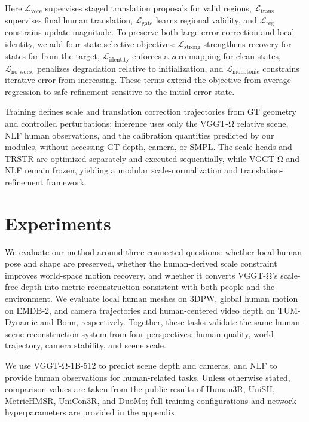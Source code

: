 \documentclass{article}
\begin{document}
Here $\mathcal{L}_{\mathrm{vote}}$ supervises staged translation proposals for valid regions, $\mathcal{L}_{\mathrm{trans}}$ supervises final human translation, $\mathcal{L}_{\mathrm{gate}}$ learns regional validity, and $\mathcal{L}_{\mathrm{reg}}$ constrains update magnitude. To preserve both large-error correction and local identity, we add four state-selective objectives: $\mathcal{L}_{\mathrm{strong}}$ strengthens recovery for states far from the target, $\mathcal{L}_{\mathrm{identity}}$ enforces a zero mapping for clean states, $\mathcal{L}_{\mathrm{no\text{-}worse}}$ penalizes degradation relative to initialization, and $\mathcal{L}_{\mathrm{monotonic}}$ constrains iterative error from increasing. These terms extend the objective from average regression to safe refinement sensitive to the initial error state.

Training defines scale and translation correction trajectories from GT geometry and controlled perturbations; inference uses only the VGGT-Ω relative scene, NLF human observations, and the calibration quantities predicted by our modules, without accessing GT depth, camera, or SMPL. The scale heads and TRSTR are optimized separately and executed sequentially, while VGGT-Ω and NLF remain frozen, yielding a modular scale-normalization and translation-refinement framework.

\section{Experiments}\label{sec:experiments}

We evaluate our method around three connected questions: whether local human pose and shape are preserved, whether the human-derived scale constraint improves world-space motion recovery, and whether it converts VGGT-Ω's scale-free depth into metric reconstruction consistent with both people and the environment. We evaluate local human meshes on 3DPW, global human motion on EMDB-2, and camera trajectories and human-centered video depth on TUM-Dynamic and Bonn, respectively. Together, these tasks validate the same human--scene reconstruction system from four perspectives: human quality, world trajectory, camera stability, and scene scale.

We use VGGT-Ω-1B-512 to predict scene depth and cameras, and NLF to provide human observations for human-related tasks. Unless otherwise stated, comparison values are taken from the public results of Human3R, UniSH, MetricHMSR, UniCon3R, and DuoMo; full training configurations and network hyperparameters are provided in the appendix.
\end{document}
